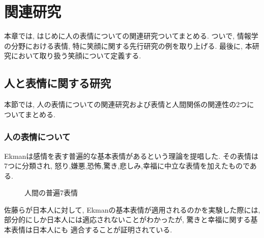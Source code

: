 \chapter{関連研究}
\label{chap:smile}

本章では, はじめに人の表情についての関連研究ついてまとめる.
ついで, 情報学の分野における表情, 特に笑顔に関する先行研究の例を取り上げる.
最後に, 本研究において取り扱う笑顔について定義する.

\section{人と表情に関する研究}
本節では, 人の表情についての関連研究および表情と人間関係の関連性の2つについてまとめる.
\subsection{人の表情について}
Ekmanは感情を表す普遍的な基本表情があるという理論を提唱した.
その表情は7つに分類され, 怒り,嫌悪,恐怖,驚き,悲しみ,幸福に中立な表情を加えたものである\cite{ekman}.
\begin{figure}[htbp]
    \begin{center}
    \end{center}
    \caption{人間の普遍7表情}
    \label{fig:universal_facial_expression}
\end{figure}
佐藤らが日本人に対して, Ekmanの基本表情が適用されるのかを実験した際には,
部分的にしか日本人には適応されないことがわかったが, 驚きと幸福に関する基本表情は日本人にも
適合することが証明されている.\cite{JapaneseFacialExpression}
